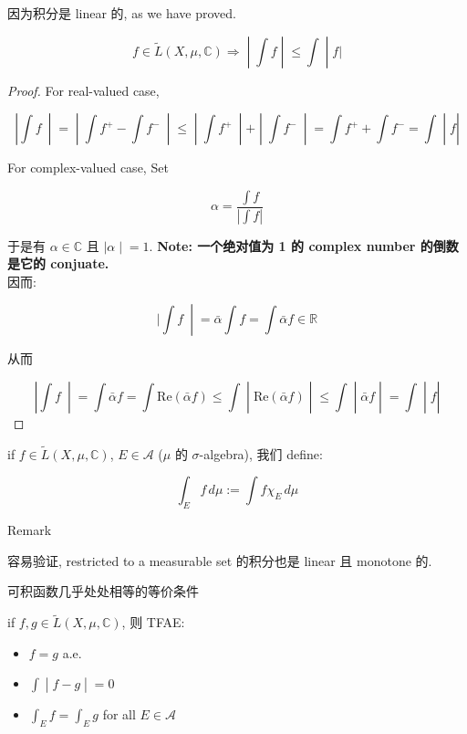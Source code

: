 因为积分是 linear 的, as we have proved.

\begin{proposition}

\[\left. f \in \widetilde{L}(X,\mu,\mathbb{C})\Longrightarrow \middle| \int f \middle| \leq \int \middle| f| \right.\]

\end{proposition}

\begin{proof}

For real-valued case,

\[\left. |\int f\  \middle| = \middle| \int f^{+} - \int f^{-}\  \middle| \leq \middle| \int f^{+}\  \middle| + \middle| \int f^{-}\  \middle| = \int f^{+} + \int f^{-} = \int \middle| f| \right.\]

For complex-valued case, Set

\[\alpha = \frac{\int f}{|\int f|}\]

于是有 \(\alpha \in \mathbb{C}\) 且 \(\left. |\alpha \middle| = 1 \right.\). \textbf{Note: 一个绝对值为 1 的 complex number 的倒数是它的 conjuate.}\\
因而:

\[\left. |\int f\  \middle| = \bar{\alpha}\int f = \int\bar{\alpha}f \in \mathbb{R} \right.\]

从而

\[\left. |\int f\  \middle| = \int\bar{\alpha}f = \int\text{Re}(\bar{\alpha}f) \leq \int \middle| \text{Re}(\bar{\alpha}f) \middle| \leq \int \middle| \bar{\alpha}f \middle| = \int \middle| f| \right.\]

\end{proof}

\begin{definition}{}

if \(f \in \widetilde{L}(X,\mu,\mathbb{C})\), \(E \in \mathcal{A}\) (\(\mu\) 的 \(\sigma\)-algebra), 我们 define:

\[\int_{E}f\, d\mu := \int f\chi_{E}\, d\mu\]

\end{definition}

\begin{qlremark}{Remark}

容易验证, restricted to a measurable set 的积分也是 linear 且 monotone 的.

\end{qlremark}

\begin{proposition}{可积函数几乎处处相等的等价条件}

if \(f,g \in \widetilde{L}(X,\mu,\mathbb{C})\), 则 TFAE:

\begin{itemize}
\item
  \(f = g\) a.e.
\item
  \(\left. \int \middle| f - g \middle| = 0 \right.\)
\item
  \(\int_{E}f = \int_{E}g\) for all \(E \in \mathcal{A}\)
\end{itemize}

\end{proposition}

